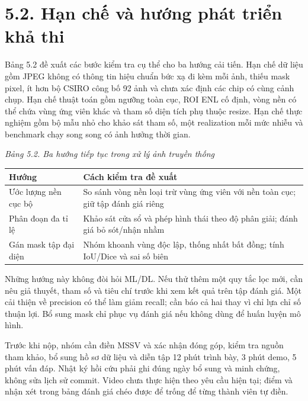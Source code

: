 \documentclass[13pt,a4paper]{extreport}
\begin{document}
\section*{5.2. Hạn chế và hướng phát triển khả thi}
Bảng 5.2 đề xuất các bước kiểm tra cụ thể cho ba hướng cải tiến. Hạn chế dữ liệu gồm JPEG không có thông tin hiệu chuẩn bức xạ đi kèm mỗi ảnh, thiếu mask pixel, ít hơn bộ CSIRO công bố 92 ảnh và chưa xác định các chip có cùng cảnh chụp. Hạn chế thuật toán gồm ngưỡng toàn cục, ROI ENL cố định, vòng nền có thể chứa vùng ứng viên khác và tham số diện tích phụ thuộc resize. Hạn chế thực nghiệm gồm bộ mẫu nhỏ cho khảo sát tham số, một realization mỗi mức nhiễu và benchmark chạy song song có ảnh hưởng thời gian.
\par
\noindent\textit{Bảng 5.2. Ba hướng tiếp tục trong xử lý ảnh truyền thống}
\begin{longtable}{p{7.3cm}|p{7.3cm}}
Hướng & Cách kiểm tra đề xuất\\\hline
Ước lượng nền cục bộ & So sánh vòng nền loại trừ vùng ứng viên với nền toàn cục; giữ tập đánh giá riêng\\\hline
Phân đoạn đa tỉ lệ & Khảo sát cửa sổ và phép hình thái theo độ phân giải; đánh giá bỏ sót/nhận nhầm\\\hline
Gán mask tập đại diện & Nhóm khoanh vùng độc lập, thống nhất bất đồng; tính IoU/Dice và sai số biên\\\hline
\end{longtable}
Những hướng này không đòi hỏi ML/DL. Nếu thử thêm một quy tắc lọc mới, cần nêu giả thuyết, tham số và tiêu chí trước khi xem kết quả trên tập đánh giá. Một cải thiện về precision có thể làm giảm recall; cần báo cả hai thay vì chỉ lựa chỉ số thuận lợi. Bổ sung mask chỉ phục vụ đánh giá nếu không dùng để huấn luyện mô hình.
\par
Trước khi nộp, nhóm cần điền MSSV và xác nhận đóng góp, kiểm tra nguồn tham khảo, bổ sung hồ sơ dữ liệu và diễn tập 12 phút trình bày, 3 phút demo, 5 phút vấn đáp. Nhật ký hồi cứu phải ghi đúng ngày bổ sung và minh chứng, không sửa lịch sử commit. Video chưa thực hiện theo yêu cầu hiện tại; điểm và nhận xét trong bảng đánh giá chéo được để trống để từng thành viên tự điền.
\par
\clearpage
\end{document}
